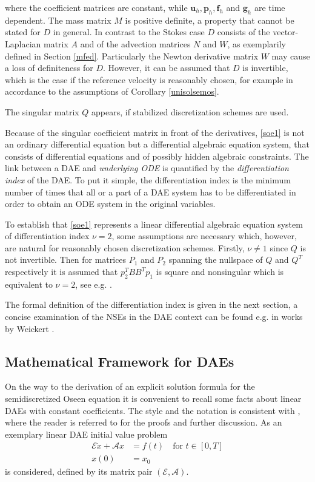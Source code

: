 \documentclass[a4paper,10pt,BCOR=15mm]{scrbook}
\begin{document}
where the coefficient matrices are constant, while $\mathbf u_h,\mathbf p_h,\mathbf f_h$ and $\mathbf g_h$ are time dependent. The mass matrix $M$ is positive definite, a property that cannot be stated for $D$ in general. In contrast to the Stokes case $D$ consists of the vector-Laplacian matrix $A$ and of the advection matrices $N$ and $W$, as exemplarily defined in Section \ref{mfed}. Particularly the Newton derivative matrix $W$ may cause a loss of definiteness for $D$. However, it can be assumed that $D$ is invertible, which is the case if the reference velocity is reasonably chosen, for example in accordance to the assumptions of Corollary \ref{unisolsemos}. 

The singular matrix $Q$ appears, if stabilized discretization schemes are used.

Because of the singular coefficient matrix in front of the derivatives, \eqref{soe1} is not an ordinary differential equation but a differential algebraic equation system, that consists of differential equations and of possibly hidden algebraic constraints. The link between a DAE and  \textit{underlying ODE} is quantified by the \textit{differentiation index} of the DAE. To put it simple, the differentiation index is the minimum number of times that all or a part of a DAE system has to be differentiated in order to obtain an ODE system in the original variables. 

 To establish that \eqref{soe1} represents a linear differential algebraic equation system of differentiation index $\nu = 2$, some assumptions are necessary which, however, are natural for reasonably chosen discretization schemes. Firstly, $\nu \neq 1$ since $Q$ is not invertible. Then for matrices $P_1$ and $P_2$ spanning the nullspace of $Q$ and $Q^T$ respectively it is assumed that $p_2^TBB^Tp_1$ is square and nonsingular which is equivalent to $\nu = 2$, see e.g. \cite{mehr}.

The formal definition of the differentiation index is given in the next section, a concise examination of the NSEs in the DAE context can be found e.g. in works by Weickert \cite{weic,weic2}.


\subsection{Mathematical Framework for DAEs}

On the way to the derivation of an explicit solution formula for the semidiscretized Oseen equation it is convenient to recall some facts about linear DAEs with constant coefficients. The style and the notation is consistent with \cite{mehr}, where the reader is referred to for the proofs and further discussion. As an exemplary linear DAE initial value problem
\begin{align}\label{odae}
 \mathcal{E} \dot{x} + \mathcal{A}x&=f(t) \quad \text{for  }t\in [0,T] \\
 x(0) &= x_0
\end{align}
is considered, defined by its matrix pair $(\mathcal{E},\mathcal{A})$. 
\end{document}
